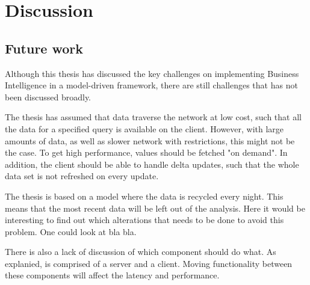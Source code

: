 \chapter{Discussion}
\label{chap:discussion}

\section{Future work}
Although this thesis has discussed the key challenges on implementing Business Intelligence in a model-driven framework, there are still challenges that has not been discussed broadly.

The thesis has assumed that data traverse the network at low cost, such that all the data for a specified query is available on the client. However, with large amounts of data, as well as slower network with restrictions, this might not be the case. To get high performance, values should be fetched "on demand". In addition, the client should be able to handle delta updates, such that the whole data set is not refreshed on every update.

The thesis is based on a model where the data is recycled every night. This means that the most recent data will be left out of the analysis. Here it would be interesting to find out which alterations that needs to be done to avoid this problem. One could look at bla bla.

There is also a lack of discussion of which component should do what. As explanied, \genusSoftware is comprised of a server and a client. Moving functionality between these components will affect the latency and performance.
